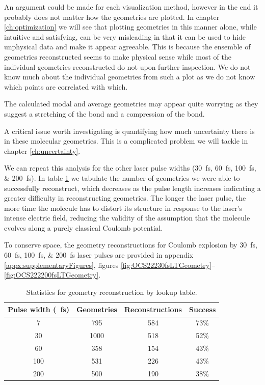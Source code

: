 An argument could be made for each visualization method, however in the end it probably does not matter how the geometries are plotted. In chapter \ref{ch:optimization} we will see that plotting geometries in this manner alone, while intuitive and satisfying, can be very misleading in that it can be used to hide unphysical data and make it appear agreeable. This is because the ensemble of geometries reconstructed seems to make physical sense while most of the individual geometries reconstructed do not upon further inspection. We do not know much about the individual geometries from such a plot as we do not know which points are correlated with which.

The calculated modal and average geometries may appear quite worrying as they suggest a stretching of the  bond and a compression of the  bond. %

A critical issue worth investigating is quantifying how much uncertainty there is in these molecular geometries. This is a complicated problem we will tackle in chapter \ref{ch:uncertainty}.

We can repeat this analysis for the other laser pulse widths (\SIlist{30;60;100;200}{\fs}). In table \ref{table:lookupTableSuccess} we tabulate the number of geometries we were able to successfully reconstruct, which decreases as the pulse length increases indicating a greater difficulty in reconstructing geometries. The longer the laser pulse, the more time the molecule has to distort its structure in response to the laser's intense electric field, reducing the validity of the assumption that the molecule evolves along a purely classical Coulomb potential.

To conserve space, the geometry reconstructions for Coulomb explosion by \SIlist{30;60;100;200}{\fs} laser pulses are provided in appendix \ref{appx:supplementaryFigures}, figures \ref{fig:OCS22230fsLTGeometry}--\ref{fig:OCS222200fsLTGeometry}.

\begin{table}
  \myfloatalign
  \centering
  \begin{tabularx}{0.875\textwidth}{cccc}
    \toprule
    Pulse width (\SI{}{\fs}) & Geometries & Reconstructions & Success \\
    \midrule
    7 & 795 & 584 & 73\% \\
    30 & 1000 & 518 & 52\% \\
    60 & 358 & 154 & 43\% \\
    100 & 531 & 226 & 43\% \\
    200 & 500 & 190 & 38\% \\
    \bottomrule
  \end{tabularx}
  \caption[Statistics for geometry reconstruction by lookup table.]
  {Statistics for geometry reconstruction by lookup table.}
  \label{table:lookupTableSuccess}
\end{table}

